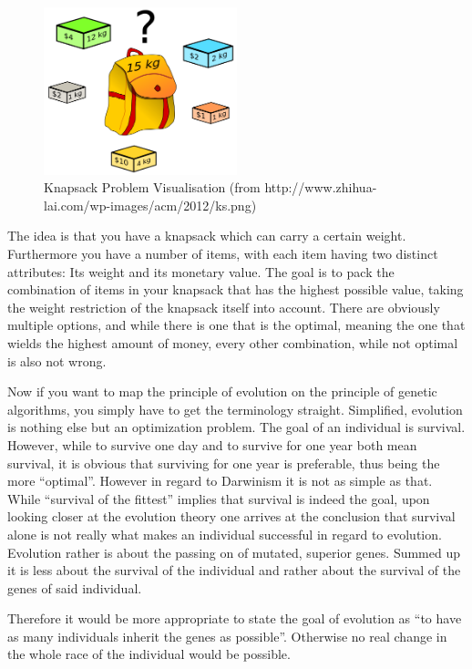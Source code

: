 \documentclass[11pt,a4paper]{article}
\begin{document}
\begin{figure}[h!]
  \centering
  \includegraphics[width=0.5\textwidth]{ks.png}
  \caption{Knapsack Problem Visualisation (from http://www.zhihua-lai.com/wp-images/acm/2012/ks.png)}
  \label{ks}
\end{figure}

The idea is that you have a knapsack which can carry a certain weight. Furthermore you have a number of items, with each item having two distinct attributes: Its weight and its monetary value. The goal is to pack the combination of items in your knapsack that has the highest possible value, taking the weight restriction of the knapsack itself into account.
\newpage
There are obviously multiple options, and while there is one that is the optimal, meaning the one that wields the highest amount of money, every other combination, while not optimal is also not wrong.

Now if you want to map the principle of evolution on the principle of genetic algorithms, you simply have to get the terminology straight. Simplified, evolution is nothing else but an optimization problem. The goal of an individual is survival. However, while to survive one day and to survive for one year both mean survival, it is obvious that surviving for one year is preferable, thus being the more “optimal”. However in regard to Darwinism it is not as simple as that. While “survival of the fittest” implies that survival is indeed the goal, upon looking closer at the evolution theory one arrives at the conclusion that survival alone is not really what makes an individual successful in regard to evolution. Evolution rather is about the passing on of mutated, superior genes. Summed up it is less about the survival of the individual and rather about the survival of the genes of said individual.

Therefore it would be more appropriate to state the goal of evolution as “to have as many individuals inherit the genes as possible”. Otherwise no real change in the whole race of the individual would be possible.
\end{document}
